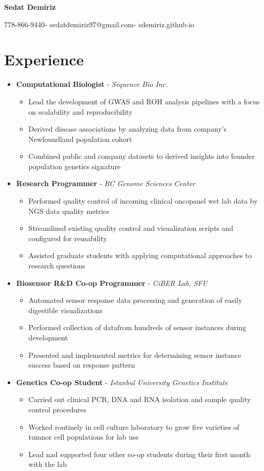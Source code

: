 \documentclass{article}
\makeatletter
\newcommand{\name}{Sedat Demiriz}
\newcommand{\email}{sedatdemiriz97@gmail.com}
\newcommand{\phone}{778-866-9440}
\newcommand{\website}{sdemiriz.github.io}
\newcommand{\customitem}{\item[] \hspace{-.85cm}}
\newcommand{\experienceheader}[2]{\customitem \textbf{#1} - \textit{#2}}
\makeatother
\begin{document}
\begin{minipage}[t]{1\textwidth} 
  \centering \Huge 
  \textbf{\name} \vspace{.5cm} 
\end{minipage}
\begin{minipage}[t]{1\textwidth} 
  \centering \normalsize 
  \phone \hspace{.1cm}-\hspace{.1cm} \email \hspace{.1cm}-\hspace{.1cm} \website 
\end{minipage}

\section*{Experience} \vspace{-.3cm}
\hrulefill
\begin{itemize}
  \experienceheader{Computational Biologist}{Sequence Bio Inc.}
    \begin{itemize}
      \customitem Lead the development of GWAS and ROH analysis pipelines with a focus on scalability and reproducibility
      \customitem Derived disease associations by analyzing data from company's Newfoundland population cohort
      \customitem Combined public and company datasets to derived insights into founder population genetics signature
    \end{itemize}
  \experienceheader{Research Programmer}{BC Genome Sciences Center}
    \begin{itemize}
      \customitem Performed quality control of incoming clinical oncopanel wet lab data by NGS data quality metrics
      \customitem Streamlined existing quality control and visualization scripts and configured for reusability
      \customitem Assisted graduate students with applying computational approaches to research questions
    \end{itemize}
  \experienceheader{Biosensor R\&D Co-op Programmer}{CiBER Lab, SFU}
    \begin{itemize}
      \customitem Automated sensor response data processing and generation of easily digestible visualizations
      \customitem Performed collection of datafrom hundreds of sensor instances during development
      \customitem Presented and implemented metrics for determining sensor instance success based on response pattern
    \end{itemize}
  \experienceheader{Genetics Co-op Student}{Istanbul University Genetics Institute}
    \begin{itemize}
      \customitem Carried out clinical PCR, DNA and RNA isolation and sample quality control procedures
      \customitem Worked routinely in cell culture laboratory to grow five varieties of tumnor cell populations for lab use
      \customitem Lead nad supported four other co-op students during their first month with the lab
    \end{itemize}
\end{itemize}
\end{document}
